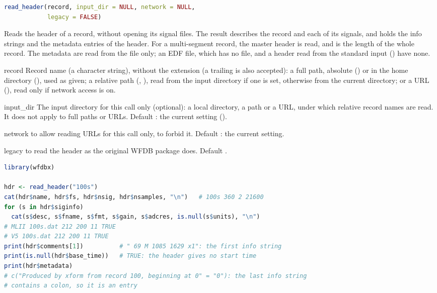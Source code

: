 \begin{lstlisting}[language=R,style=signature]
read_header(record, input_dir = NULL, network = NULL,
            legacy = FALSE)
\end{lstlisting}
Reads the header of a record, without opening its signal files. The result describes the
record and each of its signals, and holds the info strings and the metadata entries of the
header. For a multi-segment record, the master header is read, and  is the
length of the whole record. The metadata are read from the  file only; an EDF
file, which has no  file, and a header read from the standard input
() have none.
\begin{params}
\item[record] Record name (a character string), without the  extension (a
  trailing  is also accepted): a full path, absolute
  () or in the home directory
  (), used as given; a relative path (,
  ), read from the input directory if one is set, otherwise from the
  current directory; or a URL (),
  read only if network access is on.
\item[input\_dir] The input directory for this call only (optional): a local directory, a
  \code{\textasciitilde} path or a URL, under which relative record names are read. It does not
  apply to full paths or URLs. Default : the current setting
  ().
\item[network]  to allow reading URLs for this call only,  to
  forbid it. Default : the current setting.
\item[legacy]  to read the header as the original WFDB package does. Default
  .
\end{params}
\begin{lstlisting}[language=R,style=example]
library(wfdbx)

hdr <- read_header("100s")
cat(hdr$name, hdr$fs, hdr$nsig, hdr$nsamples, "\n")   # 100s 360 2 21600
for (s in hdr$siginfo)
  cat(s$desc, s$fname, s$fmt, s$gain, s$adcres, is.null(s$units), "\n")
# MLII 100s.dat 212 200 11 TRUE
# V5 100s.dat 212 200 11 TRUE
print(hdr$comments[1])          # " 69 M 1085 1629 x1": the first info string
print(is.null(hdr$base_time))   # TRUE: the header gives no start time
print(hdr$metadata)
# c("Produced by xform from record 100, beginning at 0" = "0"): the last info string
# contains a colon, so it is an entry
\end{lstlisting}

